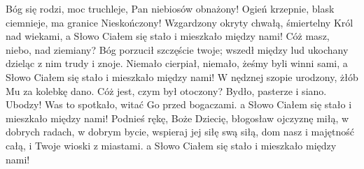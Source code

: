 \beginverse
Bóg się rodzi, moc truchleje,
Pan niebiosów obnażony!
Ogień krzepnie, blask ciemnieje,
ma granice Nieskończony!
Wzgardzony okryty chwałą,
śmiertelny Król nad wiekami,
a Słowo Ciałem się stało
i mieszkało między nami!
\endverse
\beginverse
Cóż masz, niebo, nad ziemiany?
Bóg porzucił szczęście twoje;
wszedł między lud ukochany
dzieląc z nim trudy i znoje.
Niemało cierpiał, niemało,
żeśmy byli winni sami,
a Słowo Ciałem się stało
i mieszkało między nami!
\endverse
\beginverse
W nędznej szopie urodzony,
żłób Mu za kolebkę dano.
Cóż jest, czym był otoczony?
Bydło, pasterze i siano.
Ubodzy! Was to spotkało,
witać Go przed bogaczami.
a Słowo Ciałem się stało
i mieszkało między nami!
\endverse
\beginverse
Podnieś rękę, Boże Dziecię,
błogosław ojczyznę miłą,
w dobrych radach, w dobrym bycie,
wspieraj jej siłę swą siłą,
dom nasz i majętność całą,
i Twoje wioski z miastami.
a Słowo Ciałem się stało
i mieszkało między nami!
\endverse
\endsong